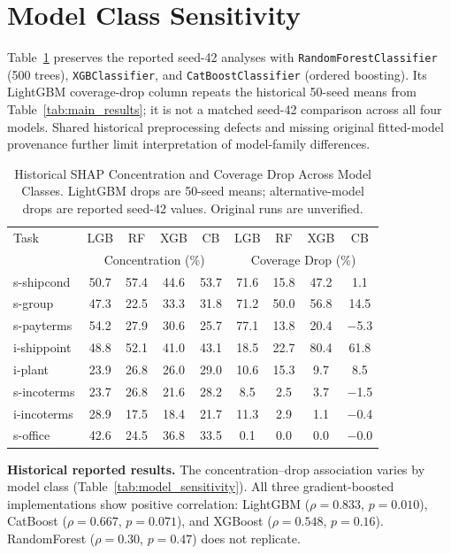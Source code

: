 \documentclass[accepted]{uai2026} %
\begin{document}
\section{Model Class Sensitivity}\label{app:rf}

Table~\ref{tab:rf} preserves the reported seed-42 analyses with \texttt{RandomForestClassifier} (500 trees), \texttt{XGBClassifier}, and \texttt{CatBoostClassifier} (ordered boosting). Its LightGBM coverage-drop column repeats the historical 50-seed means from Table~\ref{tab:main_results}; it is not a matched seed-42 comparison across all four models. Shared historical preprocessing defects and missing original fitted-model provenance further limit interpretation of model-family differences.

\begin{table}[htbp]
\centering
\caption{Historical SHAP Concentration and Coverage Drop Across Model Classes. LightGBM drops are 50-seed means; alternative-model drops are reported seed-42 values. Original runs are unverified.}\label{tab:rf}
\small
\begin{tabular}{@{}lcccccccc@{}}
\toprule
Task & LGB & RF & XGB & CB & LGB & RF & XGB & CB \\
 & \multicolumn{4}{c}{Concentration (\%)} & \multicolumn{4}{c}{Coverage Drop (\%)} \\
\midrule
s-shipcond & 50.7 & 57.4 & 44.6 & 53.7 & 71.6 & 15.8 & 47.2 & 1.1 \\
s-group & 47.3 & 22.5 & 33.3 & 31.8 & 71.2 & 50.0 & 56.8 & 14.5 \\
s-payterms & 54.2 & 27.9 & 30.6 & 25.7 & 77.1 & 13.8 & 20.4 & $-$5.3 \\
i-shippoint & 48.8 & 52.1 & 41.0 & 43.1 & 18.5 & 22.7 & 80.4 & 61.8 \\
i-plant & 23.9 & 26.8 & 26.0 & 29.0 & 10.6 & 15.3 & 9.7 & 8.5 \\
s-incoterms & 23.7 & 26.8 & 21.6 & 28.2 & 8.5 & 2.5 & 3.7 & $-$1.5 \\
i-incoterms & 28.9 & 17.5 & 18.4 & 21.7 & 11.3 & 2.9 & 1.1 & $-$0.4 \\
s-office & 42.6 & 24.5 & 36.8 & 33.5 & 0.1 & 0.0 & 0.0 & $-$0.0 \\
\bottomrule
\end{tabular}
\end{table}

\textbf{Historical reported results.} The concentration--drop association varies by model class (Table~\ref{tab:model_sensitivity}). All three gradient-boosted implementations show positive correlation: LightGBM ($\rho = 0.833$, $p = 0.010$), CatBoost ($\rho = 0.667$, $p = 0.071$), and XGBoost ($\rho = 0.548$, $p = 0.16$). RandomForest ($\rho = 0.30$, $p = 0.47$) does not replicate.
\end{document}

